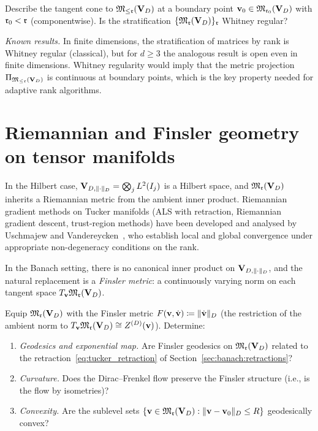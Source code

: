 \begin{problem}
\label{prob:stratification}
Describe the tangent cone to $\mathfrak{M}_{\leq\mathfrak{r}}(\mathbf{V}_D)$ at a boundary
point $\mathbf{v}_0 \in \mathfrak{M}_{\mathfrak{r}_0}(\mathbf{V}_D)$ with $\mathfrak{r}_0 < \mathfrak{r}$ (componentwise).
Is the stratification $\{\mathfrak{M}_{\mathfrak{r}}(\mathbf{V}_D)\}_{\mathfrak{r}}$ Whitney regular?

\emph{Known results.} In finite dimensions, the stratification of
matrices by rank is Whitney regular (classical), but for
$d \geq 3$ the analogous result is open even in finite dimensions.
Whitney regularity would imply that the metric projection
$\Pi_{\mathfrak{M}_{\leq\mathfrak{r}}(\mathbf{V}_D)}$ is continuous at boundary points, which
is the key property needed for adaptive rank algorithms.
\end{problem}

\section{Riemannian and Finsler geometry on tensor manifolds}
\label{sec:open:riemannian}

In the Hilbert case, $\mathbf{V}_{D,\|\cdot\|_D} = \bigotimes_j L^2(I_j)$ is a Hilbert
space, and $\mathfrak{M}_{\mathfrak{r}}(\mathbf{V}_D)$ inherits a Riemannian metric from the
ambient inner product. Riemannian gradient methods on Tucker manifolds
(ALS with retraction, Riemannian gradient descent, trust-region methods)
have been developed and analysed by Uschmajew and
Vandereycken~\cite{UschmajewVandereycken2020}, who establish local and
global convergence under appropriate non-degeneracy conditions on the
rank.

In the Banach setting, there is no canonical inner product on $\mathbf{V}_{D,\|\cdot\|_D}$,
and the natural replacement is a \emph{Finsler metric}: a continuously
varying norm on each tangent space $T_{\mathbf{v}} \mathfrak{M}_{\mathfrak{r}}(\mathbf{V}_D)$.

\begin{problem}
\label{prob:finsler}
Equip $\mathfrak{M}_{\mathfrak{r}}(\mathbf{V}_D)$ with the Finsler metric
$F(\mathbf{v}, \dot{\mathbf{v}}) \coloneqq \|\dot{\mathbf{v}}\|_D$ (the restriction of the
ambient norm to $T_{\mathbf{v}} \mathfrak{M}_{\mathfrak{r}}(\mathbf{V}_D) \cong Z^{(D)}(\mathbf{v})$). Determine:
\begin{enumerate}
\item[\textup{(a)}] \emph{Geodesics and exponential map.} Are Finsler
    geodesics on $\mathfrak{M}_{\mathfrak{r}}(\mathbf{V}_D)$ related to the retraction~\eqref{eq:tucker_retraction}
    of Section~\ref{sec:banach:retractions}?
\item[\textup{(b)}] \emph{Curvature.} Does the Dirac--Frenkel flow
    preserve the Finsler structure (i.e., is the flow by isometries)?
\item[\textup{(c)}] \emph{Convexity.} Are the sublevel sets
    $\{\mathbf{v} \in \mathfrak{M}_{\mathfrak{r}}(\mathbf{V}_D) : \|\mathbf{v} - \mathbf{v}_0\|_D \leq R\}$
    geodesically convex?
\end{enumerate}
\end{problem}

